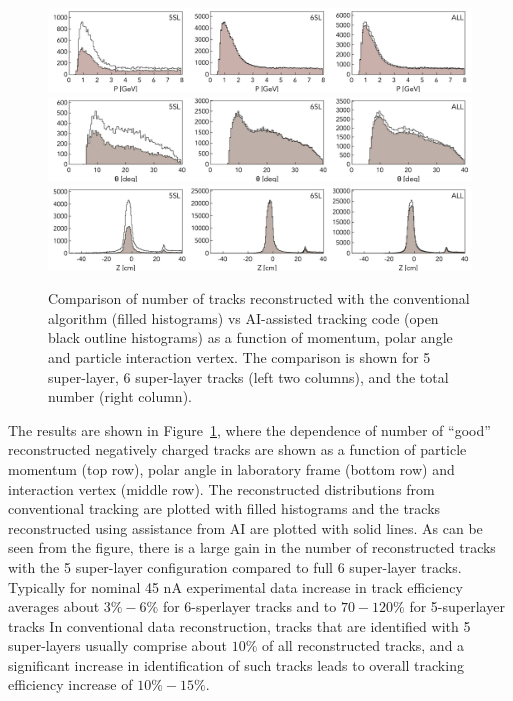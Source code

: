  \begin{figure}[!ht]
\begin{center}
  \includegraphics[width=6.5in]{images/figure_p.pdf}
  \includegraphics[width=6.5in]{images/figure_theta.pdf}
    \includegraphics[width=6.5in]{images/figure_vz.pdf}
\caption { Comparison of number of tracks reconstructed with the conventional algorithm (filled histograms) vs AI-assisted tracking code (open black outline histograms) as a function of momentum, polar angle and particle interaction vertex. The comparison is shown for 5 super-layer, 6 super-layer tracks (left two columns), and the total number (right column).}
 \label{track:efficiency}
 \end{center}
\end{figure}

The results are shown in Figure~\ref{track:efficiency}, where the dependence of number of ``good'' reconstructed negatively charged 
 tracks are shown as a function of particle momentum (top row), polar angle in laboratory frame (bottom row) and interaction
 vertex (middle row). The reconstructed distributions from conventional tracking are plotted with filled histograms and the
 tracks reconstructed using assistance from AI are plotted with solid lines. As can be seen from the figure, there is a large gain 
 in the number of reconstructed tracks with the 5 super-layer configuration compared to full 6 super-layer tracks. Typically for nominal 
 45 nA experimental data increase in track efficiency averages about $3\%-6\%$ for 6-sperlayer tracks and to $70-120\%$ for 5-superlayer tracks 
 In conventional data reconstruction, tracks that are identified with 5 super-layers usually comprise about $10\%$ of all reconstructed tracks, 
 and a significant increase in identification of such tracks leads to overall tracking efficiency increase of $10\%-15\%$. 
 
